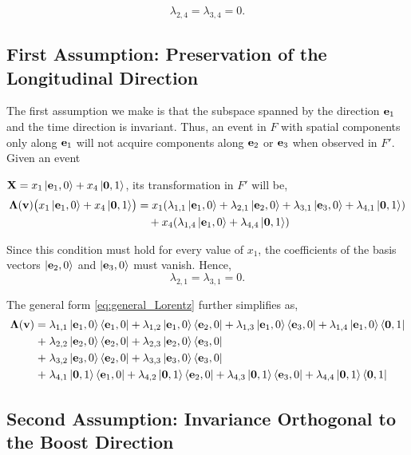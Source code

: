 \documentclass[12pt]{article}
\begin{document}
\[
\lambda_{2,4}=\lambda_{3,4}=0.
\]

\subsection{First Assumption: Preservation of the Longitudinal Direction}

The first assumption we make is that the subspace spanned by the direction
$\vb e_1$ and the time direction is invariant. Thus, an event in $F$ with
spatial components only along $\vb e_1$ will not acquire components along
$\vb e_2$ or $\vb e_3$ when observed in $F'$. Given an event

$\vb{X} = x_1\ket{\vb{e}_1, 0} + x_4\ket{\vb{0}, 1}$, its transformation in $F'$ will be,
\[
  \begin{aligned}
    \boldsymbol{\Lambda}(\vb{v})\bigl(x_1\ket{\vb{e}_1,0} + x_4\ket{\vb{0},1}\bigr)
    &= x_1\!\left(
        \lambda_{1,1}\ket{\vb{e}_1,0}
      + \lambda_{2,1}\ket{\vb{e}_2,0}
      + \lambda_{3,1}\ket{\vb{e}_3,0}
      + \lambda_{4,1}\ket{\vb{0},1}
    \right) \\
    &\quad + x_4\!\left(\lambda_{1,4}\ket{\vb{e}_1,0} + \lambda_{4,4}\ket{\vb{0},1}\right)
  \end{aligned}
\]

Since this condition must hold for every value of $x_1$, the coefficients
of the basis vectors $\ket{\vb{e}_2,0}$ and $\ket{\vb{e}_3,0}$ must vanish.
Hence,
\[
  \lambda_{2,1}=\lambda_{3,1}=0.
\]

The general form \eqref{eq:general_Lorentz} further simplifies as,
\[
  \begin{aligned}
    \boldsymbol{\Lambda}(\vb{v}) =\;
      &\lambda_{1,1}\ket{\vb{e}_1,0}\bra{\vb{e}_1,0}
      + \lambda_{1,2}\ket{\vb{e}_1,0}\bra{\vb{e}_2,0}
      + \lambda_{1,3}\ket{\vb{e}_1,0}\bra{\vb{e}_3,0}
      + \lambda_{1,4}\ket{\vb{e}_1,0}\bra{\vb{0},1} \\
    +\;&\lambda_{2,2}\ket{\vb{e}_2,0}\bra{\vb{e}_2,0}
      + \lambda_{2,3}\ket{\vb{e}_2,0}\bra{\vb{e}_3,0} \\
    +\;&\lambda_{3,2}\ket{\vb{e}_3,0}\bra{\vb{e}_2,0}
      + \lambda_{3,3}\ket{\vb{e}_3,0}\bra{\vb{e}_3,0} \\
    +\;&\lambda_{4,1}\ket{\vb{0},1}\bra{\vb{e}_1,0}
      + \lambda_{4,2}\ket{\vb{0},1}\bra{\vb{e}_2,0}
      + \lambda_{4,3}\ket{\vb{0},1}\bra{\vb{e}_3,0}
      + \lambda_{4,4}\ket{\vb{0},1}\bra{\vb{0},1}
  \end{aligned}
\]

\subsection{Second Assumption: Invariance Orthogonal to the Boost Direction}
\end{document}
